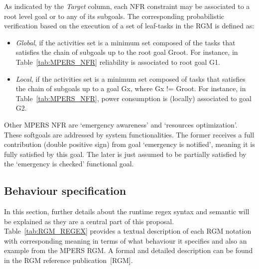 
As indicated by the \textit{Target} column, each NFR constraint may be associated to a root level goal or to any of its subgoals. The corresponding probabilistic verification based on the execution of a set of leaf-tasks in the RGM is defined as:

\begin{itemize}

\item \textit{Global}, if the activities set is a minimum set composed of the tasks that satisfies the chain of subgoals up to the root goal Groot. For instance, in Table~\ref{tab:MPERS_NFR} reliability is associated to root goal G1.
\medskip

\item \textit{Local}, if the activities set is a minimum set composed of tasks that satisfies the chain of subgoals up to a goal Gx, where Gx != Groot. For instance, in Table~\ref{tab:MPERS_NFR}, power consumption is (locally) associated to goal G2.
\medskip

\end{itemize}


Other MPERS NFR are `emergency awareness' and `resources optimization'. These softgoals are addressed by system functionalities. The former receives a full contribution (double positive sign) from goal `emergency is notified', meaning it is fully satisfied by this goal. The later is just assumed to be partially satisfied by the `emergency is checked' functional goal.

\subsection{Behaviour specification}

In this section, further details about the runtime regex syntax and semantic will be explained as they are a central part of this proposal. Table~\ref{tab:RGM_REGEX} provides a textual description of each RGM notation with corresponding meaning in terms of what behaviour it specifies and also an example from the MPERS RGM. A formal and detailed description can be found in the RGM reference publication~[RGM].

